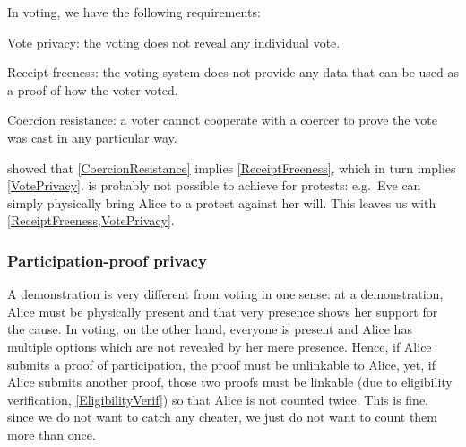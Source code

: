 In voting, we have the following requirements:
\begin{frame}
\begin{requirements}[P]
\item\label{VotePrivacy} Vote privacy: the voting does not reveal any 
  individual vote.
\item\label{ReceiptFreeness} Receipt freeness: the voting system does not 
  provide any data that can be used as a proof of how the voter voted.
\item\label{CoercionResistance} Coercion resistance: a voter cannot cooperate 
  with a coercer to prove the vote was cast in any particular way.
\end{requirements}
\pause{}
\end{frame}
\Textcite{VerifyingPrivacyPropertiesOfVotingProtocols} showed that 
\cref{CoercionResistance} implies \cref{ReceiptFreeness}, which in turn implies
\cref{VotePrivacy}.
 is probably not possible to achieve for protests:
e.g.\ Eve can simply physically bring Alice to a protest against her will.
This leaves us with \cref{ReceiptFreeness,VotePrivacy}.


\subsubsection{Participation-proof privacy}

A demonstration is very different from voting in one sense: at a demonstration, 
Alice must be physically present and that very presence shows her support for 
the cause.
In voting, on the other hand, everyone is present and Alice has multiple 
options which are not revealed by her mere presence.
Hence, if Alice submits a proof of participation, the proof must be unlinkable 
to Alice, yet, if Alice submits another proof, those two proofs must be 
linkable (due to eligibility verification, \cref{EligibilityVerif}) so that 
Alice is not counted twice.
This is fine, since we do not want to catch any cheater, we just do not want to
count them more than once.

